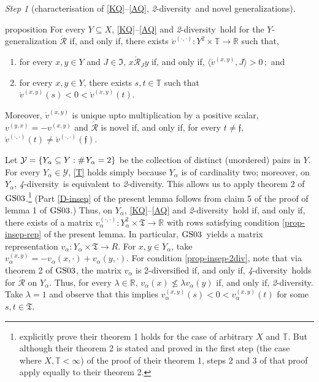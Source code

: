 \documentclass[ecta,nameyear,draft]{econsocart}
\newcommand{\countof}{\mathbin{\#}\hskip1pt}
\newcommand{\R}{\mathbb R}
\newcommand{\mc}{\mathcal}
\newcommand{\novel}{\mathfrak f}
\newcommand{\aext}{\mathrel{\acute{\mathrel{\mathcal R}}}}
\newcommand{\mbbt}{{\mathds {T}}}
\newcommand{\mbbtpp}{{\mathfrak{T}}}
\newcommand{\mbbjpp}{\mathfrak{I}}
\newcommand{\xy}{{(x, y)}}
\newcommand{\yx}{{(y, x)}}
\newcommand{\dd}{{(\cdot,\cdot)}}
\newcommand{\twodiv}{\textit{2}-\textup{diversity}}
\newcommand{\fourdiv}{\textit{4}-\textup{diversity}}
\newcommand{\gsii}{$\textup{GS03}$}
\theoremstyle{plain}
\theoremstyle{remark}
\newtheorem{step}{Step}[section]
\begin{document}
\begin{appendix}
\begin{step}[characterisation of \ref{KQ}–\ref{AQ}, \twodiv\ and novel
    {generalization}s]
  \begin{theoremEnd}{proposition}\label{prop-insep} For every $Y \subseteq X$,
    \ref{KQ}--\ref{AQ} and \twodiv\ hold for the $Y$-generalization $\aext$ if,
    and only if, there exists $\acute{v}^{\dd}: Y^2 \times \mbbt \rightarrow
    \R$ such that,
    \begin{enumerate}[label=\textup{(\roman*)}]
      \item\label{prop-insep-rep} for every $x, y \in Y$ and $J \in \mbbjpp$,
        $x \aext_J y$ if, and only if, $\langle \acute{v}^{\xy}, J \rangle >
        0$$\,;$ \textup{and}
      \item\label{prop-insep-2div} for every $x, y \in Y$, there exists $s, t
        \in \mbbt$ such that $\acute{v}^{\xy}(s) < 0 < \acute{v}^{\xy}(t)$.
    \end{enumerate}
    Moreover, $\acute{v}^{\xy}$ is unique upto multiplication by a positive
    scalar,  $v^{\yx} = - v^{\xy}$ and  $\aext$ is novel if, and only if, for
    every $t \neq \novel$, $\acute{v}^{\dd}(t) \neq \acute{v}^{\dd}(\novel)$.
  \end{theoremEnd}
  \begin{proofEnd}
    Let $\mc Y = \{Y_\alpha \subseteq Y : \countof Y_\alpha = 2\}$ be the
    collection of distinct (unordered) pairs in $Y$. For every $Y_\alpha \in
    \mc Y$, \ref{T} holds simply because $Y_\alpha$ is of cardinality two;
    moreover, on $Y_\alpha$, \fourdiv\ is equivalent to \twodiv. This allows us
    to apply theorem 2 of \gsii.\footnote{\citeauthor{gilboa2003inductive}
    explicitly prove their theorem 1 holds for the case of arbitrary $X$ and
    $\mbbt$. But although their theorem 2 is stated and proved in the first
    step (the case where $X, \mbbt < \infty$) of the proof of their theorem
    1, steps 2 and 3 of that proof apply equally to their theorem 2.} (Part
    \ref{D-insep} of the present lemma follows from claim 5 of the proof of
    lemma 1 of \gsii.) Thus, on $Y_\alpha$, \ref{KQ}–\ref{AQ} and \twodiv\
    hold if, and only if, there exists of a matrix $v^{\dd}_{\alpha}:
    Y_\alpha^2 \times \mbbtpp \rightarrow \R$ with rows satisfying condition
    \ref{prop-insep-rep} of the present lemma.  In particular, \gsii\ yields
    a matrix representation $v_\alpha : Y_\alpha \times \mbbtpp \rightarrow
    R$. For $x, y \in Y_\alpha$, take $v^{\xy}_{\alpha} = - v_{\alpha}(x,
    \cdot) + v_{\alpha}(y, \cdot)$.  For condition \ref{prop-insep-2div},
    note that via theorem 2 of \gsii, the matrix $v_\alpha$ is 2-diversified
    if, and only if, \fourdiv\ holds for $\aext$ on $Y_\alpha$. Thus, for
    every $\lambda \in \R$, $v_\alpha (x) \not \leq \lambda v_\alpha(y)$ if,
    and only if, \twodiv. Take $\lambda = 1$ and observe that this implies
    $v^{\xy}_{\alpha}(s) < 0 < v^{\xy}_{\alpha}(t)$ for some $s, t \in
    \mbbtpp$.
   

\end{proofEnd}
\end{step}
\end{appendix}
\end{document}
